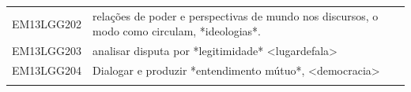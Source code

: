 \documentclass[12pt]{extarticle}
\begin{document}
\begin{longtable}{ll}
EM13LGG202 & relações de poder e perspectivas de mundo nos discursos, o modo como circulam, *ideologias*.                                                                                                                                                                                                                                                                                                                                                                                                                                                                                                                                                                                                                                                                                                                          \\
\rowcolor[HTML]{E0F7FA} 
EM13LGG203 & analisar disputa por *legitimidade* \textless{}lugardefala\textgreater{}                                                                                                                                                                                                                                                                                                                                                                                                                                                                                                                                                                                                                                                                                                                                              \\
\rowcolor[HTML]{FFF} 
EM13LGG204 & Dialogar e produzir *entendimento mútuo*, \textless{}democracia\textgreater{}                                                                                                                                                                                                                                                                                                                                                                                                                                                                                                                                                                                                                                                                                                                                         \\
\rowcolor[HTML]{E0F7FA} 

\end{longtable}
\end{document}
